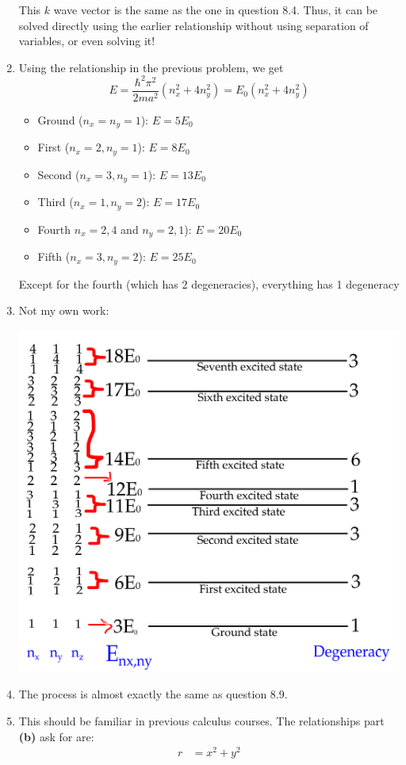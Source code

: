 \documentclass{article}
\begin{document}
\begin{enumerate}[label=(8.\arabic*)]
     This $k$ wave vector is the same as the one in question 8.4. Thus, it can be solved directly using the earlier relationship without using separation of variables, or even solving it!
    \item Using the relationship in the previous problem, we get 
    \begin{equation*}
        E = \frac{\hbar^2\pi^2}{2ma^2}(n_x^2+4n_y^2) = E_0(n_x^2+4n_y^2)
    \end{equation*}
    \begin{itemize}
        \item Ground ($n_x=n_y=1$): $E=5E_0$
        \item First ($n_x=2,n_y=1$): $E=8E_0$
        \item Second ($n_x=3, n_y=1$): $E=13E_0$
        \item Third ($n_x=1,n_y=2$): $E=17E_0$
        \item Fourth $n_x=2,4$ and $n_y=2,1$): $E=20E_0$
        \item Fifth ($n_x=3,n_y=2$): $E=25E_0$
    \end{itemize}
    Except for the fourth (which has 2 degeneracies), everything has 1 degeneracy
    \setcounter{enumi}{12}
    \item Not my own work:
    \begin{center}
        \includegraphics[width=0.6\linewidth]{figs/8.13.png}
    \end{center}
    \setcounter{enumi}{14}
    \item The process is almost exactly the same as question 8.9.
    \item This should be familiar in previous calculus courses. The relationships part \textbf{(b)} ask for are:
    \begin{align*}
        r &= x^2+y^2 \\ 

\end{align*}
\end{enumerate}
\end{document}
